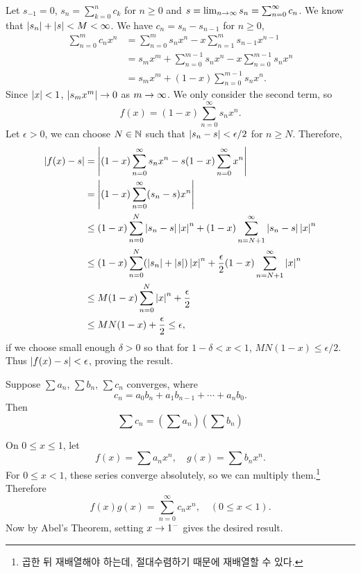 \pf Let \(s_{-1} = 0\), \(s_n = \sum_{k=0}^n c_k\) for \(n \geq 0\) and \(s = \lim_{n\rightarrow\infty} s_n = \sum_{n=0}^\infty c_n\). We know that \(\left| s_n \right| + \left| s \right| < M <\infty\). We have \(c_n = s_n - s_{n-1}\) for \(n \geq 0\),
\[
    \begin{aligned}
        \sum_{n=0}^m c_nx^n & = \sum_{n=0}^m s_n x^n - x \sum_{n=1}^m s_{n-1}x^{n-1}            \\
                            & = s_m x^m + \sum_{n=0}^{m-1} s_n x^n - x \sum_{n=0}^{m-1} s_n x^n \\
                            & = s_m x^m + (1-x) \sum_{n=0}^{m-1}s_n x^n.
    \end{aligned}
\]
Since \(\left| x \right| < 1\), \(\left| s_m x^m \right| \rightarrow 0\) as \(m \rightarrow \infty\). We only consider the second term, so
\[
    f(x) = (1-x) \sum_{n=0}^\infty s_n x^n.
\]
Let \(\epsilon > 0\), we can choose \(N\in \mathbb{N}\) such that \(\left| s_n - s \right| < \epsilon / 2\) for \(n \geq N\).
Therefore,
\[
    \begin{aligned}
        \left| f(x) - s \right| & = \left| (1-x) \sum_{n=0}^\infty s_n x^n - s(1-x) \sum_{n=0}^\infty x^n \right|                                        \\
                       & = \left| (1-x) \sum_{n=0}^\infty (s_n - s) x^n \right|                                                                 \\
                       & \leq (1-x) \sum_{n=0}^N \left| s_n - s \right| \left| x \right|^n + (1-x) \sum_{n=N+1}^\infty \left| s_n-s \right| \left| x \right|^n             \\
                       & \leq (1-x) \sum_{n=0}^N (\left| s_n \right| +\left| s \right|) \left| x \right|^n + \frac{\epsilon}{2}(1-x)\sum_{n=N+1}^\infty \left| x \right|^n \\
                       & \leq M(1-x) \sum_{n=0}^N  \left| x \right|^n + \frac{\epsilon}{2}                                                      \\
                       & \leq MN(1-x) + \frac{\epsilon}{2} \leq \epsilon,
    \end{aligned}
\]
if we choose small enough \(\delta > 0\) so that for \(1 - \delta < x < 1\), \(MN(1-x) \leq \epsilon / 2\). Thus \(\left| f(x) - s \right| < \epsilon\), proving the result.

  Suppose \(\sum a_n\), \(\sum b_n\), \(\sum c_n\) converges, where
\[
    c_n = a_0 b_n + a_1 b_{n-1} + \cdots + a_n b_0.
\]
Then
\[
    \sum c_n = \left(\sum a_n\right) \left(\sum b_n\right)
\]

\pf On \(0 \leq x \leq 1\), let
\[
    f(x) = \sum a_n x^n, \quad g(x) = \sum b_n x^n.
\]
For \(0 \leq x < 1\), these series converge absolutely, so we can multiply them.\footnote{곱한 뒤 재배열해야 하는데, 절대수렴하기 때문에 재배열할 수 있다.} Therefore
\[
    f(x)g(x) = \sum_{n=0}^\infty c_n x^n, \quad (0 \leq x < 1).
\]
Now by Abel's Theorem, setting \(x \rightarrow 1^-\) gives the desired result.

